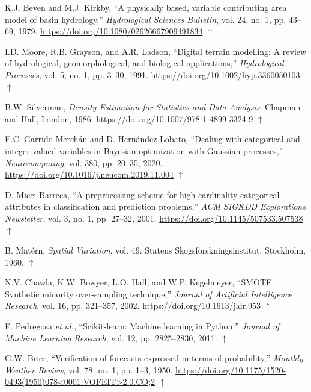 \documentclass[letterpaper,11pt]{tec}
\begin{document}
{\begin{thebibliography}{}
 K.J. Beven and M.J. Kirkby, ``A physically based, variable contributing area model of basin hydrology,'' {\it Hydrological Sciences Bulletin}, vol. 24, no. 1, pp. 43--69, 1979.
\url{https://doi.org/10.1080/02626667909491834}
$\uparrow$\par

 I.D. Moore, R.B. Grayson, and A.R. Ladson, ``Digital terrain modelling: A review of hydrological, geomorphological, and biological applications,'' {\it Hydrological Processes}, vol. 5, no. 1, pp. 3--30, 1991.
\url{https://doi.org/10.1002/hyp.3360050103}
$\uparrow$\par

 B.W. Silverman, {\it Density Estimation for Statistics and Data Analysis}. Chapman and Hall, London, 1986.
\url{https://doi.org/10.1007/978-1-4899-3324-9}
$\uparrow$\par

 E.C. Garrido-Merchán and D. Hernández-Lobato, ``Dealing with categorical and integer-valued variables in Bayesian optimization with Gaussian processes,'' {\it Neurocomputing}, vol. 380, pp. 20--35, 2020.
\url{https://doi.org/10.1016/j.neucom.2019.11.004}
$\uparrow$\par

 D. Micci-Barreca, ``A preprocessing scheme for high-cardinality categorical attributes in classification and prediction problems,'' {\it ACM SIGKDD Explorations Newsletter}, vol. 3, no. 1, pp. 27--32, 2001.
\url{https://doi.org/10.1145/507533.507538}
$\uparrow$\par

 B. Matérn, {\it Spatial Variation}, vol. 49. Statens Skogsforskningsinstitut, Stockholm, 1960.
$\uparrow$\par

 N.V. Chawla, K.W. Bowyer, L.O. Hall, and W.P. Kegelmeyer, ``SMOTE: Synthetic minority over-sampling technique,'' {\it Journal of Artificial Intelligence Research}, vol. 16, pp. 321--357, 2002.
\url{https://doi.org/10.1613/jair.953}
$\uparrow$\par

 F. Pedregosa {\it et al.}, ``Scikit-learn: Machine learning in Python,'' {\it Journal of Machine Learning Research}, vol. 12, pp. 2825--2830, 2011.
$\uparrow$\par

 G.W. Brier, ``Verification of forecasts expressed in terms of probability,'' {\it Monthly Weather Review}, vol. 78, no. 1, pp. 1--3, 1950.
\url{https://doi.org/10.1175/1520-0493(1950)078<0001:VOFEIT>2.0.CO;2}
$\uparrow$\par


\end{thebibliography}}
\end{document}
